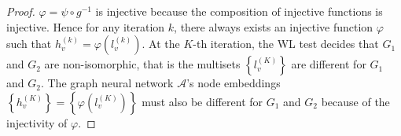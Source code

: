 \begin{appendix}
\begin{proof}
$\varphi = \psi \circ g^{-1} $ is injective  because the composition of injective functions is injective. Hence for any iteration $k$, there always exists an injective function $\varphi$ such that $h_v^{(k)} = \varphi \left( l_v^{(k)} \right)$. At the $K$-th iteration, the WL test decides that $G_1$ and $G_2$ are non-isomorphic, that is the multisets $\left\lbrace l_v^{(K)} \right\rbrace$ are different for $G_1$ and $G_2$. The graph neural network $\mathcal{A}$'s node embeddings  $\left\lbrace h_v^{(K)} \right\rbrace = \left\lbrace \varphi \left( l_v^{(K)} \right) \right\rbrace $ must also be different for $G_1$ and $G_2$ because of the injectivity of $\varphi$. 


\end{proof}
\end{appendix}
